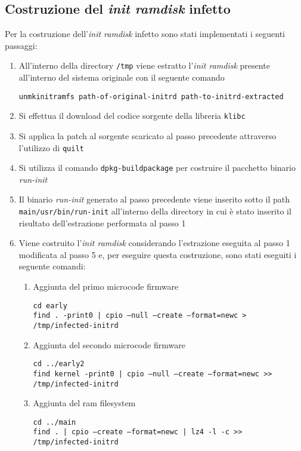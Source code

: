 \documentclass[oneside]{article}
\begin{document}
\subsection{Costruzione del \textit{init ramdisk} infetto}
Per la costruzione dell'\textit{init ramdisk} infetto sono stati implementati i seguenti passaggi:
\begin{enumerate}
\item All'interno della directory \texttt{/tmp} viene estratto l'\textit{init ramdisk} presente all'interno del sistema originale con il seguente comando
\begin{tcolorbox}
\texttt{unmkinitramfs path-of-original-initrd path-to-initrd-extracted}
\end{tcolorbox}
\item Si effettua il download del codice sorgente della libreria \texttt{klibc}
\item Si applica la patch al sorgente scaricato al passo precedente attraverso l'utilizzo di \texttt{quilt}
\item Si utilizza il comando \texttt{dpkg-buildpackage} per costruire il pacchetto binario \textit{run-init}
\item Il binario \textit{run-init} generato al passo precedente viene inserito sotto il path \texttt{main/usr/bin/run-init} all'interno della directory in cui è stato inserito il risultato dell'estrazione performata al passo 1
\item Viene costruito l'\textit{init ramdisk} considerando l'estrazione eseguita al passo 1 modificata al passo 5 e, per eseguire questa costruzione, sono stati eseguiti i seguente comandi:
\begin{enumerate}
\item Aggiunta del primo microcode firmware
\begin{tcolorbox}
\texttt{cd early} \\
\texttt{find . -print0 | cpio --null --create --format=newc > /tmp/infected-initrd}
\end{tcolorbox}

\item Aggiunta del secondo microcode firmware
\begin{tcolorbox}
\texttt{cd ../early2} \\
\texttt{find kernel -print0 | cpio --null --create --format=newc >> /tmp/infected-initrd}
\end{tcolorbox}

\item Aggiunta del ram filesystem
\begin{tcolorbox}
\texttt{cd ../main} \\
\texttt{find . | cpio --create --format=newc | lz4 -l -c >> /tmp/infected-initrd}
\end{tcolorbox}


\end{enumerate}
\end{enumerate}
\end{document}
